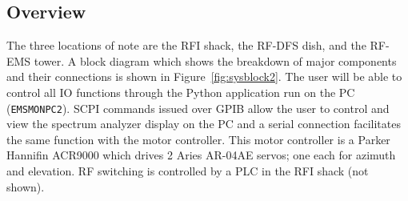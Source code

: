 \documentclass[titlepage]{article}
\begin{document}
\subsection{Overview}
The three locations of note are the RFI shack, the RF-DFS dish, and the RF-EMS tower. A block diagram which shows the breakdown of major components and their connections is shown in Figure~\ref{fig:sysblock2}. The user will be able to control all IO functions through the Python application run on the PC (\verb|EMSMONPC2|).  SCPI commands issued over GPIB allow the user to control and view the spectrum analyzer display on the PC and a serial connection facilitates the same function with the motor controller. This motor controller is a Parker Hannifin ACR9000 which drives 2 Aries AR-04AE servos; one each for azimuth and elevation. RF switching is controlled by a PLC in the RFI shack (not shown).
\end{document}
